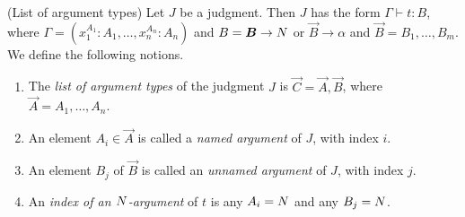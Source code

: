 \begin{definition}(List of argument types)
Let $J$ be a judgment.
Then $J$ has the form $\Gamma \vdash t:B$,
where $\Gamma = (x_1^{A_1}:A_1,\ldots, x_n^{A_n}:A_n)$ and 
$B = \vec{B}\rightarrow \N$ or $\vec{B}\rightarrow \alpha$ and 
$\vec{B}=B_{1}, \ldots, B_{m}$. 
We define the following notions. 

\begin{enumerate}
\item
The \emph{list of argument types} of the judgment $J$ is $\vec{C} = \vec{A},\vec{B}$,
where $\vec{A} = A_1,\ldots,A_n$.

\item
An element $A_i \in \vec{A}$ is called a \emph{named argument} of $J$, with index $i$.
    
\item
An element $B_j$ of $\vec{B}$ is called an \emph{unnamed argument} of $J$, with
index $j$. 

\item
An \emph{index of an ${N}$-argument} 
of $t$ is any $A_i = {N}$ and any $B_j = {N}$.

\end{enumerate}
\end{definition}

